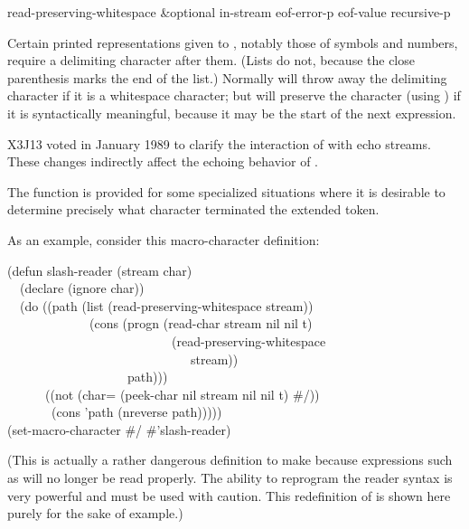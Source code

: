 \begin{defun}[Function]
read-preserving-whitespace &optional in-stream eof-error-p eof-value recursive-p

Certain printed representations given to , notably those of symbols
and numbers, require a delimiting character after them.  (Lists do not, because
the close parenthesis marks the end of the list.)
Normally  will throw away the delimiting character if it is a
whitespace character;
but  will preserve the character (using ) if it is
syntactically meaningful, because it may be the start of the next expression.

\begin{new}
X3J13 voted in January 1989
to clarify the interaction of 
with echo streams.  These changes indirectly affect the echoing behavior
of .
\end{new}

The function  is provided for some specialized
situations where it is desirable to determine precisely what character
terminated the extended token.

As an example, consider this macro-character definition:
\begin{lisp}
(defun slash-reader (stream char) \\
~~(declare (ignore char)) \\
~~(do ((path (list (read-preserving-whitespace stream)) \\
~~~~~~~~~~~~~(cons (progn (read-char stream nil nil t) \\
~~~~~~~~~~~~~~~~~~~~~~~~~~(read-preserving-whitespace \\
~~~~~~~~~~~~~~~~~~~~~~~~~~~~~stream)) \\
~~~~~~~~~~~~~~~~~~~path))) \\
~~~~~~((not (char= (peek-char nil stream nil nil t) \#{\Xbackslash}/)) \\
~~~~~~~(cons 'path (nreverse path))))) \\
(set-macro-character \#{\Xbackslash}/ \#'slash-reader)
\end{lisp}
(This is actually a rather dangerous definition to make because
expressions such as  will no longer be read properly.
The ability to reprogram the reader syntax is very powerful and
must be used with caution.  This redefinition of \cd{/} is shown
here purely for the sake of example.)


\end{defun}

